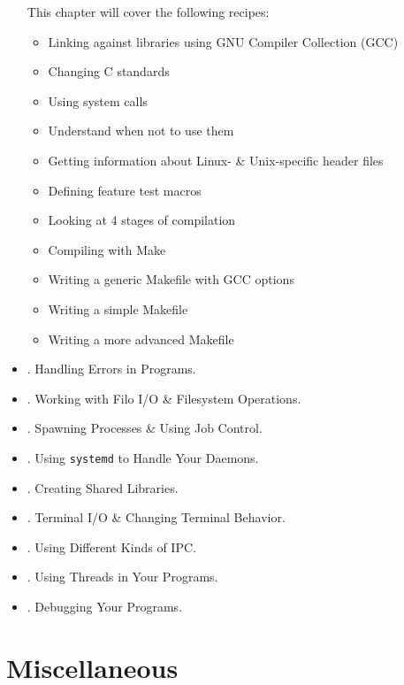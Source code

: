 \documentclass{article}
\begin{document}
\begin{itemize}
    This chapter will cover the following recipes:
    \begin{itemize}
        \item Linking against libraries using GNU Compiler Collection (GCC)
        \item Changing C standards
        \item Using system calls
        \item Understand when not to use them
        \item Getting information about Linux- \& Unix-specific header files
        \item Defining feature test macros
        \item Looking at 4 stages of compilation
        \item Compiling with Make
        \item Writing a generic Makefile with GCC options
        \item Writing a simple Makefile
        \item Writing a more advanced Makefile
    \end{itemize}
    \item {. Handling Errors in Programs.}
    \item {. Working with Filo I/O \& Filesystem Operations.}
    \item {. Spawning Processes \& Using Job Control.}
    \item {. Using {\tt systemd} to Handle Your Daemons.}
    \item {. Creating Shared Libraries.}
    \item {. Terminal I/O \& Changing Terminal Behavior.}
    \item {. Using Different Kinds of IPC.}
    \item {. Using Threads in Your Programs.}
    \item {. Debugging Your Programs.}
\end{itemize}


\section{Miscellaneous}


\printbibliography[heading=bibintoc]
    
\end{document}
